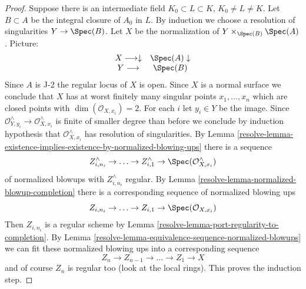\begin{proof}
\medskip\noindent
Suppose there is an intermediate field $K_0 \subset L \subset K$,
$K_0 \not = L \not = K$. Let $B \subset A$ be the integral closure
of $A_0$ in $L$. By induction we choose a resolution of singularities
$Y \to \Spec(B)$. Let $X$ be the normalization
of $Y \times_{\Spec(B)} \Spec(A)$. Picture:
$$
\begin{array}{cc}X \longrightarrow\downarrow & \Spec(A) \downarrow \\ Y \longrightarrow & \Spec(B)\end{array}
$$
Since $A$ is J-2 the regular locus of $X$ is open. Since $X$
is a normal surface we conclude that $X$ has at worst finitely
many singular points $x_1, \ldots, x_n$ which are closed points with
$\dim(\mathcal{O}_{X, x_i}) = 2$.
For each $i$ let $y_i \in Y$ be the image.
Since
$\mathcal{O}_{Y, y_i}^\wedge \to \mathcal{O}_{X, x_i}^\wedge$
is finite of smaller degree than before we conclude by
induction hypothesis that $\mathcal{O}_{X, x_i}^\wedge$
has resolution of singularities. By
Lemma \ref{resolve-lemma-existence-implies-existence-by-normalized-blowing-ups}
there is a sequence
$$
Z^\wedge_{i, n_i} \to \ldots \to Z^\wedge_{i, 1} \to
\Spec(\mathcal{O}_{X, x_i}^\wedge)
$$
of normalized blowups with $Z^\wedge_{i, n_i}$ regular.
By Lemma \ref{resolve-lemma-normalized-blowup-completion}
there is a corresponding sequence of normalized blowing ups
$$
Z_{i, n_i} \to \ldots \to Z_{i, 1} \to \Spec(\mathcal{O}_{X, x_i})
$$
Then $Z_{i, n_i}$ is a regular scheme by
Lemma \ref{resolve-lemma-port-regularity-to-completion}.
By Lemma \ref{resolve-lemma-equivalence-sequence-normalized-blowups}
we can fit these normalized blowing ups
into a corresponding sequence
$$
Z_n \to Z_{n - 1} \to \ldots \to Z_1 \to X
$$
and of course $Z_n$ is regular too (look at the local rings).
This proves the induction step.


\end{proof}
